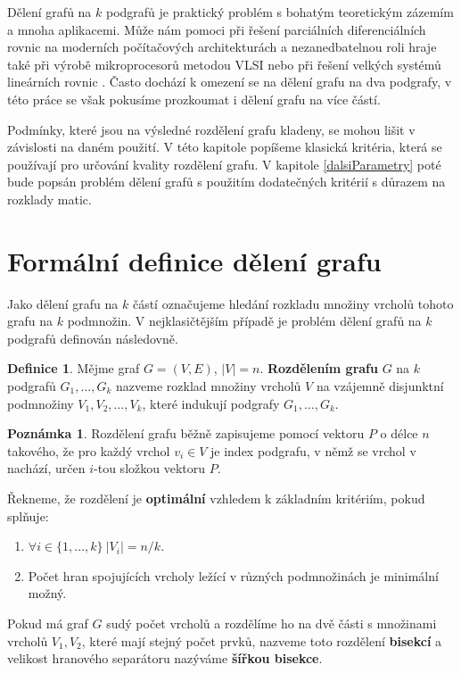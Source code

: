 \documentclass{ctuthesis}
\theoremstyle{plain}
\theoremstyle{definition}
\newtheorem{definition}{Definice}
\newtheorem{remark}{Poznámka}
\begin{document}
Dělení grafů na $k$ podgrafů je praktický problém s bohatým teoretickým zázemím a mnoha aplikacemi. Může nám pomoci při řešení parciálních diferenciálních rovnic na moderních počítačových architekturách \cite{posl:90} a nezanedbatelnou roli hraje také při výrobě mikroprocesorů metodou VLSI nebo při řešení velkých systémů lineárních rovnic \cite{keli:70, pis:84}. Často dochází k omezení se na dělení grafu na dva podgrafy, v této práce se však pokusíme prozkoumat i dělení grafu na více částí.

Podmínky, které jsou na výsledné rozdělení grafu kladeny, se mohou lišit v závislosti na daném použití. V této kapitole popíšeme klasická kritéria, která se používají pro určování kvality rozdělení grafu. V kapitole \ref{dalsiParametry} poté bude popsán problém dělení grafů s použitím dodatečných kritérií s důrazem na rozklady matic.

\section{Formální definice dělení grafu}

Jako dělení grafu na $k$ částí označujeme hledání rozkladu množiny vrcholů tohoto grafu na $k$ podmnožin. V nejklasičtějším případě je problém dělení grafů na $k$ podgrafů definován následovně.
\begin{definition}
  Mějme graf $G=(V,E)$, $|V| = n$. \textbf{Rozdělením grafu} $G$ na $k$ podgrafů $G_1, \ldots, G_k$ nazveme rozklad množiny vrcholů $V$ na vzájemně disjunktní podmnožiny $V_1, V_2, \ldots, V_k$, které indukují podgrafy $G_1, \ldots, G_k$.   
\end{definition}

\begin{remark}
  Rozdělení grafu běžně zapisujeme pomocí vektoru $P$ o délce $n$ takového, že pro každý vrchol $v_i \in V$ je index podgrafu, v němž se vrchol v nachází, určen $i$-tou složkou vektoru $P$.  
\end{remark}

Řekneme, že rozdělení je \textbf{optimální} vzhledem k základním kritériím, pokud splňuje:
\begin{enumerate}
  \item $\forall i \in \{1, \ldots, k \} \ |V_i|=n/k$.
  \item Počet hran spojujících vrcholy ležící v různých podmnožinách je minimální možný.
\end{enumerate}

Pokud má graf $G$ sudý počet vrcholů a rozdělíme ho na dvě části s množinami vrcholů $V_1, V_2$, které mají stejný počet prvků, nazveme toto rozdělení \textbf{bisekcí} a velikost hranového separátoru nazýváme \textbf{šířkou bisekce}.
\end{document}
